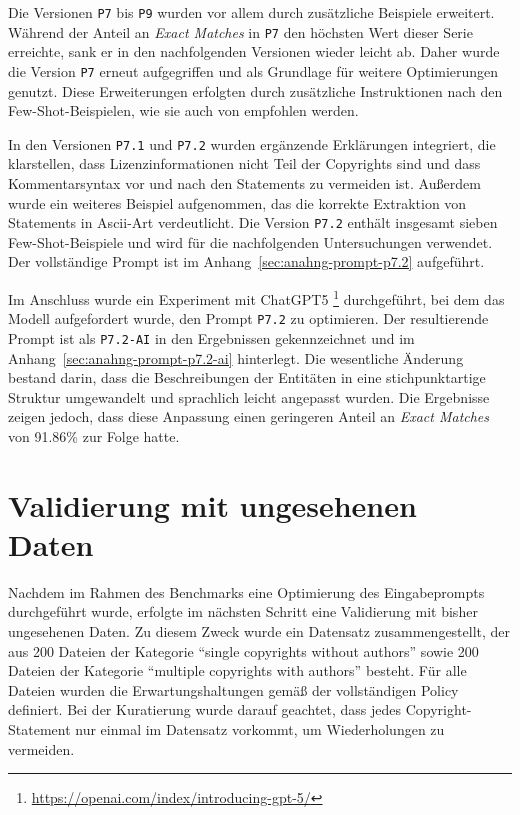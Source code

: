 Die Versionen \texttt{P7} bis \texttt{P9} wurden vor allem durch zusätzliche Beispiele erweitert.
Während der Anteil an \textit{Exact Matches} in \texttt{P7} den höchsten Wert dieser Serie erreichte, sank er in den nachfolgenden Versionen wieder leicht ab.
Daher wurde die Version \texttt{P7} erneut aufgegriffen und als Grundlage für weitere Optimierungen genutzt.
Diese Erweiterungen erfolgten durch zusätzliche Instruktionen nach den Few-Shot-Beispielen, wie sie auch von \citeauthor{cheng_novel_2024} empfohlen werden\autocite{cheng_novel_2024}.

In den Versionen \texttt{P7.1} und \texttt{P7.2} wurden ergänzende Erklärungen integriert, die klarstellen, dass Lizenzinformationen nicht Teil der Copyrights sind und dass Kommentarsyntax vor und nach den Statements zu vermeiden ist.
Außerdem wurde ein weiteres Beispiel aufgenommen, das die korrekte Extraktion von Statements in Ascii-Art verdeutlicht.
Die Version \texttt{P7.2} enthält insgesamt sieben Few-Shot-Beispiele und wird für die nachfolgenden Untersuchungen verwendet.
Der vollständige Prompt ist im Anhang~\ref{sec:anahng-prompt-p7.2} aufgeführt.

Im Anschluss wurde ein Experiment mit ChatGPT5 \footnote{\url{https://openai.com/index/introducing-gpt-5/}} durchgeführt, bei dem das Modell aufgefordert wurde, den Prompt \texttt{P7.2} zu optimieren.
Der resultierende Prompt ist als \texttt{P7.2-AI} in den Ergebnissen gekennzeichnet und im Anhang~\ref{sec:anahng-prompt-p7.2-ai} hinterlegt.
Die wesentliche Änderung bestand darin, dass die Beschreibungen der Entitäten in eine stichpunktartige Struktur umgewandelt und sprachlich leicht angepasst wurden.
Die Ergebnisse zeigen jedoch, dass diese Anpassung einen geringeren Anteil an \textit{Exact Matches} von \num{91.86}\% zur Folge hatte.


\section{Validierung mit ungesehenen Daten}

Nachdem im Rahmen des Benchmarks eine Optimierung des Eingabeprompts durchgeführt wurde, erfolgte im nächsten Schritt eine Validierung mit bisher ungesehenen Daten.
Zu diesem Zweck wurde ein Datensatz zusammengestellt, der aus \num{200} Dateien der Kategorie \enquote{single copyrights without authors} sowie \num{200} Dateien der Kategorie \enquote{multiple copyrights with authors} besteht.
Für alle Dateien wurden die Erwartungshaltungen gemäß der vollständigen Policy definiert.
Bei der Kuratierung wurde darauf geachtet, dass jedes Copyright-Statement nur einmal im Datensatz vorkommt, um Wiederholungen zu vermeiden.

